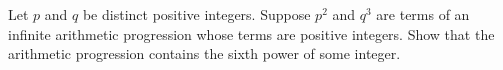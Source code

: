 Let $p$ and $q$ be distinct positive integers. Suppose $p^2$ and $q^3$ are terms of an infinite arithmetic progression whose terms are positive integers. Show that the arithmetic progression contains the sixth power of some integer.
